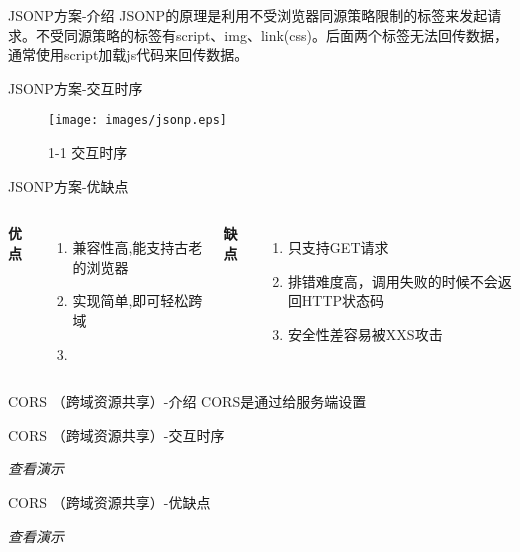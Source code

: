 \documentclass[aspectratio=169,xcolor=dvipsnames,UTF8]{beamer}
\begin{document}
\begin{frame}{JSONP方案-介绍}
JSONP的原理是利用不受浏览器同源策略限制的标签来发起请求。不受同源策略的标签有script、img、link(css)。后面两个标签无法回传数据，通常使用script加载js代码来回传数据。
\end{frame}

\begin{frame}{JSONP方案-交互时序}
    \begin{figure}
	\texttt{[image: images/jsonp.eps]}
        \caption{1-1 交互时序}
    \end{figure}
\end{frame}

\begin{frame}{JSONP方案-优缺点}
\begin{columns}[c]
        \textbf{优点}
            \begin{enumerate}
                \item 兼容性高,能支持古老的浏览器
                \item 实现简单,即可轻松跨域
                \item 
            \end{enumerate}
        \textbf{缺点}
            \begin{enumerate}
                \item 只支持GET请求
                \item 排错难度高，调用失败的时候不会返回HTTP状态码
                \item 安全性差容易被XXS攻击
            \end{enumerate}
\end{columns}
\end{frame}


\begin{frame}{CORS （跨域资源共享）-介绍}
CORS是通过给服务端设置
\end{frame}

\begin{frame}{CORS （跨域资源共享）-交互时序}
    \begin{block}{}
			\emph{查看演示}
	\end{block}  
\end{frame}

\begin{frame}{CORS （跨域资源共享）-优缺点}
    \begin{block}{}
			\emph{查看演示}
	\end{block} 
\end{frame}
\end{document}

